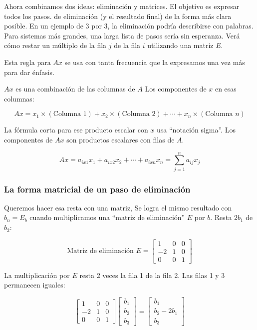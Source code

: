 Ahora combinamos dos ideas: eliminación y matrices. El objetivo es expresar todos los pasos.
de eliminación (y el resultado final) de la forma más clara posible. En un ejemplo de 3 por 3,
la eliminación podría describirse con palabras. Para sistemas más grandes, una larga lista de pasos sería
sin esperanza. Verá cómo restar un múltiplo de la fila $j$ de la fila $i$ utilizando una matriz $E$.

Esta regla para $Ax$ se usa con tanta frecuencia que la expresamos una vez más para dar énfasis.

$Ax$ es una combinación de las columnas de $A$ Los componentes de $x$ en esas columnas:

\begin{equation}
	Ax= x_{1}\times (\text{Columna 1})+x_2 \times (\text{Columna 2})+\cdots+x_{n}\times (\text{Columna $n$})
\end{equation}

\begin{notation}
	La fórmula corta para ese producto escalar con $x$ usa ``notación sigma''.
	Los componentes de $Ax$ son productos escalares con filas de $A$.

	\begin{equation}
		Ax= a_{ix1}x_{1}+ a_{ix2}x_2 +\cdots +a_{ixn}x_{n} = \sum_{j=1}^{n} a_{ij}x_{j}
	\end{equation}
\end{notation}

\subsubsection{La forma matricial de un paso de eliminación}

Queremos hacer esa resta con una matriz, Se logra el mismo resultado con $b_{n} = E_{b}$
cuando multiplicamos una ``matriz de eliminación'' $E$ por $b$. Resta $2b_{1}$ de $b_2 $:

\begin{equation}
	\text{Matriz de eliminación } E=\begin{bmatrix}
		1 & 0 & 0 \\ -2& 1& 0 \\ 0 &0 &1
	\end{bmatrix}
\end{equation}

La multiplicación por $E$ resta 2 veces la fila 1 de la fila 2. Las filas 1 y 3 permanecen iguales:

\begin{equation}
	\begin{bmatrix}
		1 & 0 & 0 \\ -2& 1& 0 \\ 0 &0 &1
	\end{bmatrix} \begin{bmatrix}
		b_1\\b_2 \\b_{3}
	\end{bmatrix}= \begin{bmatrix}
		b_1\\b_2 -2b_{1}\\b_{3}
	\end{bmatrix}
\end{equation}

